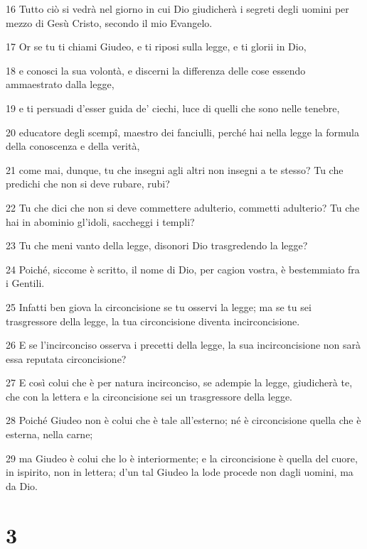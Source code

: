 \par 16 Tutto ciò si vedrà nel giorno in cui Dio giudicherà i segreti degli uomini per mezzo di Gesù Cristo, secondo il mio Evangelo.
\par 17 Or se tu ti chiami Giudeo, e ti riposi sulla legge, e ti glorii in Dio,
\par 18 e conosci la sua volontà, e discerni la differenza delle cose essendo ammaestrato dalla legge,
\par 19 e ti persuadi d'esser guida de' ciechi, luce di quelli che sono nelle tenebre,
\par 20 educatore degli scempî, maestro dei fanciulli, perché hai nella legge la formula della conoscenza e della verità,
\par 21 come mai, dunque, tu che insegni agli altri non insegni a te stesso? Tu che predichi che non si deve rubare, rubi?
\par 22 Tu che dici che non si deve commettere adulterio, commetti adulterio? Tu che hai in abominio gl'idoli, saccheggi i templi?
\par 23 Tu che meni vanto della legge, disonori Dio trasgredendo la legge?
\par 24 Poiché, siccome è scritto, il nome di Dio, per cagion vostra, è bestemmiato fra i Gentili.
\par 25 Infatti ben giova la circoncisione se tu osservi la legge; ma se tu sei trasgressore della legge, la tua circoncisione diventa incirconcisione.
\par 26 E se l'incirconciso osserva i precetti della legge, la sua incirconcisione non sarà essa reputata circoncisione?
\par 27 E così colui che è per natura incirconciso, se adempie la legge, giudicherà te, che con la lettera e la circoncisione sei un trasgressore della legge.
\par 28 Poiché Giudeo non è colui che è tale all'esterno; né è circoncisione quella che è esterna, nella carne;
\par 29 ma Giudeo è colui che lo è interiormente; e la circoncisione è quella del cuore, in ispirito, non in lettera; d'un tal Giudeo la lode procede non dagli uomini, ma da Dio.

\chapter{3}

